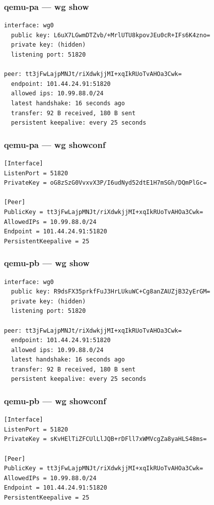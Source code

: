 \documentclass[11pt,a4paper]{article}
\begin{document}
\subsubsection*{qemu-pa — wg show}
\begin{lstlisting}
interface: wg0
  public key: L6uX7LGwmDTZvb/+MrlUTU8kpovJEu0cR+IFs6K4zno=
  private key: (hidden)
  listening port: 51820

peer: tt3jFwLajpMNJt/riXdwkjjMI+xqIkRUoTvAHOa3Cwk=
  endpoint: 101.44.24.91:51820
  allowed ips: 10.99.88.0/24
  latest handshake: 16 seconds ago
  transfer: 92 B received, 180 B sent
  persistent keepalive: every 25 seconds

\end{lstlisting}

\subsubsection*{qemu-pa — wg showconf}
\begin{lstlisting}
[Interface]
ListenPort = 51820
PrivateKey = oG8zSzG0VvxvX3P/I6udNyd52dtE1H7mSGh/DQmPlGc=

[Peer]
PublicKey = tt3jFwLajpMNJt/riXdwkjjMI+xqIkRUoTvAHOa3Cwk=
AllowedIPs = 10.99.88.0/24
Endpoint = 101.44.24.91:51820
PersistentKeepalive = 25

\end{lstlisting}

\subsubsection*{qemu-pb — wg show}
\begin{lstlisting}
interface: wg0
  public key: R9dsFX35prkfFuJ3HrLUkuWC+Cg8anZAUZjB32yErGM=
  private key: (hidden)
  listening port: 51820

peer: tt3jFwLajpMNJt/riXdwkjjMI+xqIkRUoTvAHOa3Cwk=
  endpoint: 101.44.24.91:51820
  allowed ips: 10.99.88.0/24
  latest handshake: 16 seconds ago
  transfer: 92 B received, 180 B sent
  persistent keepalive: every 25 seconds

\end{lstlisting}

\subsubsection*{qemu-pb — wg showconf}
\begin{lstlisting}
[Interface]
ListenPort = 51820
PrivateKey = sKvHElTiZFCUlLlJQB+rDFll7xWMVcgZa8yaHLS48ms=

[Peer]
PublicKey = tt3jFwLajpMNJt/riXdwkjjMI+xqIkRUoTvAHOa3Cwk=
AllowedIPs = 10.99.88.0/24
Endpoint = 101.44.24.91:51820
PersistentKeepalive = 25

\end{lstlisting}
\end{document}
